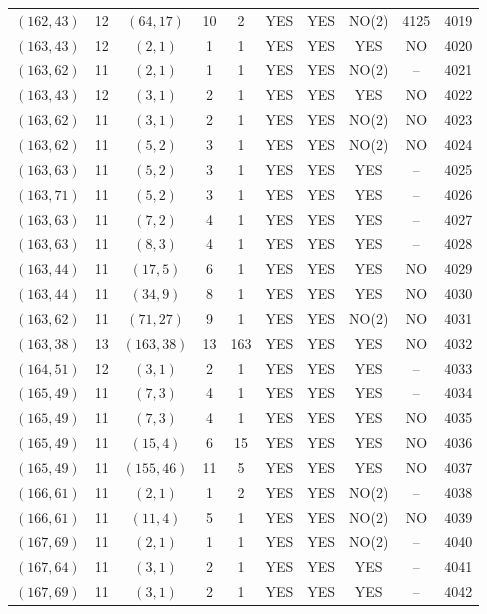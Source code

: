 \begin{longtable}{|c|c|c|c|c|c|c|c|c|c|}
$(162, 43)$ & 12 & $(64, 17)$ & 10 & 2 & YES & YES & NO(2) & 4125 & 4019\\
$(163, 43)$ & 12 & $(2, 1)$ & 1 & 1 & YES & YES & YES & NO & 4020\\
$(163, 62)$ & 11 & $(2, 1)$ & 1 & 1 & YES & YES & NO(2) & -- & 4021\\
$(163, 43)$ & 12 & $(3, 1)$ & 2 & 1 & YES & YES & YES & NO & 4022\\
$(163, 62)$ & 11 & $(3, 1)$ & 2 & 1 & YES & YES & NO(2) & NO & 4023\\
$(163, 62)$ & 11 & $(5, 2)$ & 3 & 1 & YES & YES & NO(2) & NO & 4024\\
$(163, 63)$ & 11 & $(5, 2)$ & 3 & 1 & YES & YES & YES & -- & 4025\\
$(163, 71)$ & 11 & $(5, 2)$ & 3 & 1 & YES & YES & YES & -- & 4026\\
$(163, 63)$ & 11 & $(7, 2)$ & 4 & 1 & YES & YES & YES & -- & 4027\\
$(163, 63)$ & 11 & $(8, 3)$ & 4 & 1 & YES & YES & YES & -- & 4028\\
$(163, 44)$ & 11 & $(17, 5)$ & 6 & 1 & YES & YES & YES & NO & 4029\\
$(163, 44)$ & 11 & $(34, 9)$ & 8 & 1 & YES & YES & YES & NO & 4030\\
$(163, 62)$ & 11 & $(71, 27)$ & 9 & 1 & YES & YES & NO(2) & NO & 4031\\
$(163, 38)$ & 13 & $(163, 38)$ & 13 & 163 & YES & YES & YES & NO & 4032\\
$(164, 51)$ & 12 & $(3, 1)$ & 2 & 1 & YES & YES & YES & -- & 4033\\
$(165, 49)$ & 11 & $(7, 3)$ & 4 & 1 & YES & YES & YES & -- & 4034\\
$(165, 49)$ & 11 & $(7, 3)$ & 4 & 1 & YES & YES & YES & NO & 4035\\
$(165, 49)$ & 11 & $(15, 4)$ & 6 & 15 & YES & YES & YES & NO & 4036\\
$(165, 49)$ & 11 & $(155, 46)$ & 11 & 5 & YES & YES & YES & NO & 4037\\
$(166, 61)$ & 11 & $(2, 1)$ & 1 & 2 & YES & YES & NO(2) & -- & 4038\\
$(166, 61)$ & 11 & $(11, 4)$ & 5 & 1 & YES & YES & NO(2) & NO & 4039\\
$(167, 69)$ & 11 & $(2, 1)$ & 1 & 1 & YES & YES & NO(2) & -- & 4040\\
$(167, 64)$ & 11 & $(3, 1)$ & 2 & 1 & YES & YES & YES & -- & 4041\\
$(167, 69)$ & 11 & $(3, 1)$ & 2 & 1 & YES & YES & YES & -- & 4042\\

\end{longtable}
